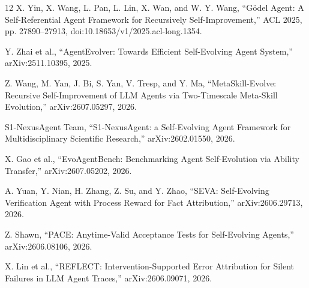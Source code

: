 \documentclass[11pt]{article}
\begin{document}
\begin{thebibliography}{12}
X. Yin, X. Wang, L. Pan, L. Lin, X. Wan, and W. Y. Wang, ``G\"odel Agent: A Self-Referential Agent Framework for Recursively Self-Improvement,'' ACL 2025, pp. 27890--27913, doi:10.18653/v1/2025.acl-long.1354.

Y. Zhai et al., ``AgentEvolver: Towards Efficient Self-Evolving Agent System,'' arXiv:2511.10395, 2025.

Z. Wang, M. Yan, J. Bi, S. Yan, V. Tresp, and Y. Ma, ``MetaSkill-Evolve: Recursive Self-Improvement of LLM Agents via Two-Timescale Meta-Skill Evolution,'' arXiv:2607.05297, 2026.

S1-NexusAgent Team, ``S1-NexusAgent: a Self-Evolving Agent Framework for Multidisciplinary Scientific Research,'' arXiv:2602.01550, 2026.

X. Gao et al., ``EvoAgentBench: Benchmarking Agent Self-Evolution via Ability Transfer,'' arXiv:2607.05202, 2026.

A. Yuan, Y. Nian, H. Zhang, Z. Su, and Y. Zhao, ``SEVA: Self-Evolving Verification Agent with Process Reward for Fact Attribution,'' arXiv:2606.29713, 2026.

Z. Shawn, ``PACE: Anytime-Valid Acceptance Tests for Self-Evolving Agents,'' arXiv:2606.08106, 2026.

X. Lin et al., ``REFLECT: Intervention-Supported Error Attribution for Silent Failures in LLM Agent Traces,'' arXiv:2606.09071, 2026.
\end{thebibliography}
\end{document}
